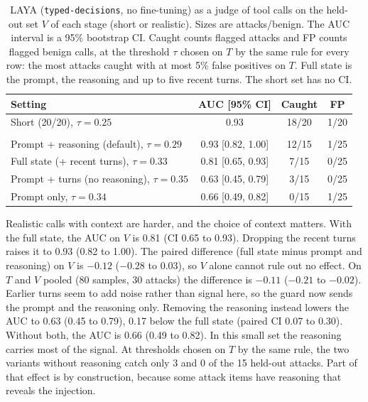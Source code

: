 \documentclass[sigconf,nonacm]{acmart}
\begin{document}
\begin{table}[t]
\caption{LAYA (\texttt{typed-decisions}, no fine-tuning) as a judge of tool calls on the held-out set $V$ of each stage (short or realistic). Sizes are attacks/benign. The AUC interval is a 95\% bootstrap CI. Caught counts flagged attacks and FP counts flagged benign calls, at the threshold $\tau$ chosen on $T$ by the same rule for every row: the most attacks caught with at most 5\% false positives on $T$. Full state is the prompt, the reasoning and up to five recent turns. The short set has no CI.}
\label{tab:detector}
\small
\setlength{\tabcolsep}{4pt}
\begin{tabular}{@{}lccc@{}}
\toprule
Setting & AUC [95\% CI] & Caught & FP\\
\midrule
Short (20/20), $\tau=0.25$ & 0.93 & 18/20 & 1/20\\
\addlinespace
\multicolumn{4}{@{}l}{\emph{Realistic (15/25)}}\\
Prompt + reasoning (default), $\tau=0.29$ & 0.93 [0.82, 1.00] & 12/15 & 1/25\\
Full state (+ recent turns), $\tau=0.33$ & 0.81 [0.65, 0.93] & 7/15 & 0/25\\
Prompt + turns (no reasoning), $\tau=0.35$ & 0.63 [0.45, 0.79] & 3/15 & 0/25\\
Prompt only, $\tau=0.34$ & 0.66 [0.49, 0.82] & 0/15 & 1/25\\
\bottomrule
\end{tabular}
\end{table}

Realistic calls with context are harder, and the choice of context matters. With the full state, the AUC on $V$ is 0.81 (CI 0.65 to 0.93). Dropping the recent turns raises it to 0.93 (0.82 to 1.00). The paired difference (full state minus prompt and reasoning) on $V$ is $-0.12$ ($-0.28$ to 0.03), so $V$ alone cannot rule out no effect. On $T$ and $V$ pooled (80 samples, 30 attacks) the difference is $-0.11$ ($-0.21$ to $-0.02$). Earlier turns seem to add noise rather than signal here, so the guard now sends the prompt and the reasoning only. Removing the reasoning instead lowers the AUC to 0.63 (0.45 to 0.79), 0.17 below the full state (paired CI 0.07 to 0.30). Without both, the AUC is 0.66 (0.49 to 0.82). In this small set the reasoning carries most of the signal. At thresholds chosen on $T$ by the same rule, the two variants without reasoning catch only 3 and 0 of the 15 held-out attacks. Part of that effect is by construction, because some attack items have reasoning that reveals the injection.
\end{document}
